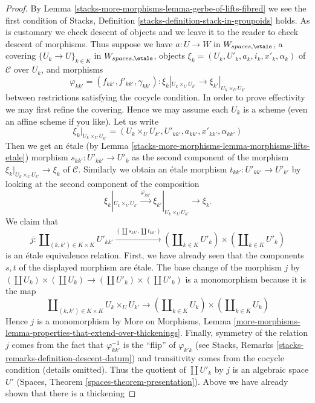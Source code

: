 \begin{proof}
By Lemma \ref{stacks-more-morphisms-lemma-gerbe-of-lifts-fibred} we see the first condition
of Stacks, Definition \ref{stacks-definition-stack-in-groupoids} holds.
As is customary we check descent of objects and we leave it to the reader
to check descent of morphisms. Thus suppose we have $a : U \to W$
in $W_{spaces, \etale}$, a covering $\{U_k \to U\}_{k \in K}$ in
$W_{spaces, \etale}$, objects $\xi_k = (U_k, U'_k, a_k, i_k, x'_k, \alpha_k)$
of $\mathcal{C}$ over $U_k$, and morphisms
$$
\varphi_{kk'} = (f_{kk'}, f'_{kk'}, \gamma_{kk'}) :
\xi_k|_{U_k \times_U U_{k'}} \to
\xi_{k'}|_{U_k \times_U U_{k'}}
$$
between restrictions satisfying the cocycle condition. In order to prove
effectivity we may first refine the covering. Hence we may assume each
$U_k$ is a scheme (even an affine scheme if you like). Let us write
$$
\xi_k|_{U_k \times_U U_{k'}} =
(U_k \times_U U_{k'}, U'_{kk'}, a_{kk'}, x'_{kk'}, \alpha_{kk'})
$$
Then we get an \'etale (by Lemma \ref{stacks-more-morphisms-lemma-morphisms-lifts-etale}) morphism
$s_{kk'} : U'_{kk'} \to U'_k$
as the second component of the morphism
$\xi_k|_{U_k \times_U U_{k'}} \to \xi_k$ of $\mathcal{C}$.
Similarly we obtain an \'etale morphism $t_{kk'} : U'_{kk'} \to U'_{k'}$
by looking at the second component of the composition
$$
\xi_k|_{U_k \times_U U_{k'}} \xrightarrow{\varphi_{kk'}}
\xi_{k'}|_{U_k \times_U U_{k'}} \to \xi_{k'}
$$
We claim that
$$
j :
\coprod\nolimits_{(k, k') \in K \times K} U'_{kk'}
\xrightarrow{(\coprod s_{kk'}, \coprod t_{kk'})}
(\coprod\nolimits_{k \in K} U'_k) \times (\coprod\nolimits_{k \in K} U'_k)
$$
is an \'etale equivalence relation. First, we have already seen
that the components $s, t$ of the displayed morphism are \'etale.
The base change of the morphism $j$ by
$(\coprod U_k) \times (\coprod U_k) \to (\coprod U'_k) \times (\coprod U'_k)$
is a monomorphism because it is the map
$$
\coprod\nolimits_{(k, k') \in K \times K} U_k \times_U U_{k'}
\longrightarrow
(\coprod\nolimits_{k \in K} U_k) \times (\coprod\nolimits_{k \in K} U_k)
$$
Hence $j$ is a monomorphism by More on Morphisms, Lemma
\ref{more-morphisms-lemma-properties-that-extend-over-thickenings}.
Finally, symmetry of the relation $j$ comes from the fact that
$\varphi_{kk'}^{-1}$ is the ``flip'' of $\varphi_{k'k}$ (see
Stacks, Remarks \ref{stacks-remarks-definition-descent-datum})
and transitivity comes from the cocycle condition (details omitted).
Thus the quotient of $\coprod U'_k$ by $j$ is an algebraic space $U'$
(Spaces, Theorem \ref{spaces-theorem-presentation}).
Above we have already shown that there is a thickening

\end{proof}
